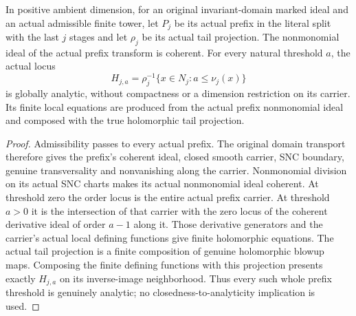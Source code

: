 \begin{lemma}
\label{hir:original-companion-history-prefix-order-analytic-equations}
\leanok
{}
In positive ambient dimension, for an original invariant-domain marked ideal
and an actual admissible finite
tower, let $P_j$ be its actual prefix in the literal split with the last
$j$ stages and let $\rho_j$ be its actual tail
projection. The nonmonomial ideal of the actual prefix transform is coherent.
For every natural threshold $a$, the actual locus
\[
 H_{j,a}=\rho_j^{-1}\{x\in N_j:a\le\nu_j(x)\}
\]
is globally analytic, without compactness or a dimension restriction on its
carrier. Its finite local equations are produced from the actual prefix
nonmonomial ideal and composed with the true holomorphic tail projection.
\end{lemma}
\begin{proof}
Admissibility passes to every actual prefix. The original domain transport
therefore gives the prefix's coherent ideal, closed smooth carrier, SNC
boundary, genuine transversality and nonvanishing along the carrier.
Nonmonomial division on its actual SNC charts makes its actual nonmonomial
ideal coherent. At threshold zero the order locus is the entire actual
prefix carrier. At threshold $a>0$ it is the intersection of that carrier
with the zero locus of the coherent derivative ideal of order $a-1$ along
it. Those derivative generators and the carrier's actual local defining
functions give finite holomorphic equations. The actual tail projection is
a finite composition of genuine holomorphic blowup maps. Composing the
finite defining functions with this projection presents exactly $H_{j,a}$
on its inverse-image neighborhood. Thus every such whole prefix threshold
is genuinely analytic; no closedness-to-analyticity implication is used.
\end{proof}

